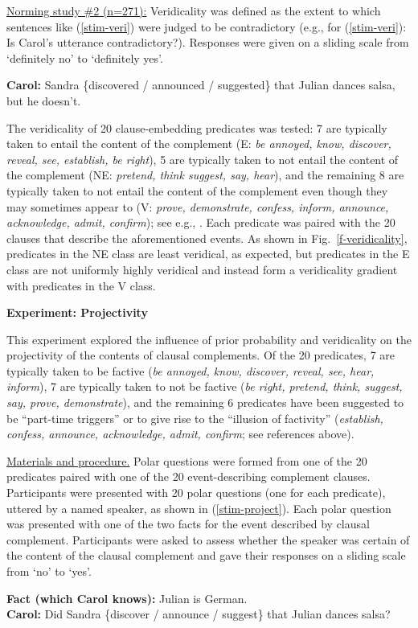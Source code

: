 \documentclass[12pt,fleqn]{article}
\newcommand{\6}{\mbox{$[\hspace*{-.6mm}[$}}
\newcommand{\9}{\mbox{$]\hspace*{-.6mm}]$}}
\begin{document}
\underline{Norming study \#2 (n=271):} Veridicality was defined as the extent to which sentences like (\ref{stim-veri}) were judged to be contradictory (e.g., for (\ref{stim-veri}): Is Carol's utterance contradictory?). Responses were given on a sliding scale from `definitely no' to `definitely yes'. 
\vspace*{-.2cm}
\begin{exe}
\ex\label{stim-veri} {\bf Carol:} Sandra \{discovered / announced / suggested\} that Julian dances salsa, but he doesn't. 
\end{exe}
\vspace*{-.2cm}
The veridicality of 20 clause-embedding predicates was tested: 7 are typically taken to entail the content of the complement (E: {\em be annoyed, know, discover, reveal, see, establish, be right}), 5 are typically taken to not entail the content of the complement (NE: {\em pretend, think suggest, say, hear}), and the remaining 8 are typically taken to not entail the content of the complement even though they may sometimes appear to (V: {\em prove, demonstrate, confess, inform, announce, acknowledge, admit, confirm}); see e.g., \citealt{schlenker10,swanson2012,anand-hacquard2014}. Each predicate was paired with the 20 clauses that describe the aforementioned events. As shown in Fig.~\ref{f-veridicality}, predicates in the NE class are least veridical, as expected, but predicates in the E class are not uniformly highly veridical and instead form a veridicality gradient with predicates in the V class.

{\bf Experiment: Projectivity}

This experiment explored the influence of prior probability and veridicality on the projectivity of the contents of clausal complements. Of the 20 predicates, 7 are typically taken to be factive ({\em be annoyed, know, discover, reveal, see, hear, inform}), 7 are typically taken to not be factive ({\em be right, pretend, think, suggest, say, prove, demonstrate}), and the remaining 6 predicates have been suggested to be ``part-time triggers'' or to give rise to the ``illusion of factivity'' ({\em establish,  confess, announce, acknowledge, admit, confirm}; see references above).

\underline{Materials and procedure.} Polar questions were formed from one of the 20 predicates paired with one of the 20 event-describing complement clauses. Participants were presented with 20 polar questions (one for each predicate), uttered by a named speaker, as shown in (\ref{stim-project}). Each polar question was presented with one of the two facts for the event described by clausal complement. Participants were asked to assess whether the speaker was certain of the content of the clausal complement and gave their responses on a sliding scale from `no' to `yes'. 
\vspace*{-.2cm}
\begin{exe}
\ex\label{stim-project} {\bf Fact (which Carol knows):} Julian is German.  \\ 
{\bf Carol:} Did Sandra \{discover / announce / suggest\} that Julian dances salsa?
\end{exe}
\vspace*{-.2cm}
\end{document}
